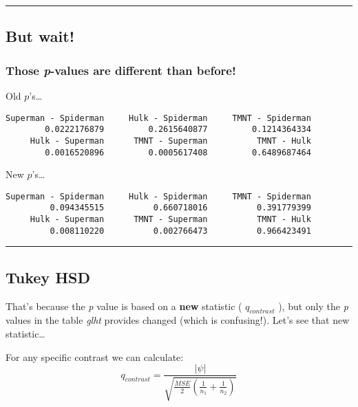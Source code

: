 \documentclass[]{article}
\begin{document}
\begin{center}\rule{0.5\linewidth}{\linethickness}\end{center}

\hypertarget{but-wait}{%
\subsection{But wait!}\label{but-wait}}

\hypertarget{those-p-values-are-different-than-before}{%
\subsubsection{\texorpdfstring{Those \emph{p}-values are different than
before!}{Those p-values are different than before!}}\label{those-p-values-are-different-than-before}}

Old \(p\)'s\ldots{}

\begin{verbatim}
Superman - Spiderman     Hulk - Spiderman     TMNT - Spiderman 
        0.0222176879         0.2615640877         0.1214364334 
     Hulk - Superman      TMNT - Superman          TMNT - Hulk 
        0.0016520896         0.0005617408         0.6489687464 
\end{verbatim}

New \(p\)'s\ldots{}

\begin{verbatim}
Superman - Spiderman     Hulk - Spiderman     TMNT - Spiderman 
         0.094345515          0.660718016          0.391779399 
     Hulk - Superman      TMNT - Superman          TMNT - Hulk 
         0.008110220          0.002766473          0.966423491 
\end{verbatim}

\begin{center}\rule{0.5\linewidth}{\linethickness}\end{center}

\hypertarget{tukey-hsd}{%
\subsection{Tukey HSD}\label{tukey-hsd}}

That's because the \emph{p} value is based on a \textbf{new} statistic (
\(q_{contrast}\) ), but only the \emph{p} values in the table
\emph{glht} provides changed (which is confusing!). Let's see that new
statistic\ldots{}

For any specific contrast we can calculate:
\[q_{contrast}=\frac{|\psi|}{\sqrt{\frac{MSE}{2}({\frac{1}{n_1}+\frac{1}{n_2}})}}\]
\end{document}
